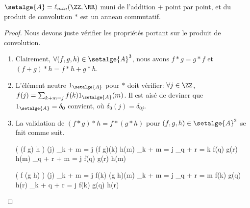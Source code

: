 
\begin{fact}
	$\setalge{A} = \ell_{min}(\ZZ , \RR)$
	muni de l'addition $+$ point par point, et du produit de convolution $\ast$
	est un anneau commutatif.
\end{fact}


\begin{proof}
	Nous devons juste vérifier les propriétés portant sur le produit de convolution.
	\begin{enumerate}
		\item Clairement,
		$\forall (f,g,h) \in \setalge{A}^3$, nous avons
		$f \ast g = g \ast f$
		et
		$(f + g) \ast h = f \ast h + g \ast h$.


		\item L'élément neutre $1_{\setalge{A}}$ pour $\ast$ doit vérifier:
		$\forall j \in \ZZ$,
		$f(j) = \sum_{k + m = j} f(k) 1_{\setalge{A}}(m)$.
		Il est aisé de deviner que $1_{\setalge{A}} = \delta_0$ convient,
		où $\delta_{0}(j) = \delta_{0j}$.


		\item La validation de
		$(f \ast g) \ast h = f \ast (g \ast h)$
		pour
		$(f,g,h) \in \setalge{A}^3$
		se fait comme suit.

		\begin{multicols}{2}
        	\setlength{\columnseprule}{.75pt}
	
	
    		\begin{stepcalc}[style=ar*]
    			\big( (f \ast g) \ast h \big) (j)
    		\explnext{}
    			\dsum_{k + m = j} (f \ast g)(k) h(m)
    		\explnext{}
    			\dsum_{k + m = j} \dsum_{q + r = k} f(q) g(r) h(m)
    		\explnext{}
    			\dsum_{q + r + m = j} f(q) g(r) h(m)
    		\end{stepcalc}
	
	
    		\begin{stepcalc}[style=ar*]
    			\big( f \ast (g \ast h) \big) (j)
    		\explnext{}
    			\dsum_{k + m = j} f(k) (g \ast h)(m)
    		\explnext{}
    			\dsum_{k + m = j} \dsum_{q + r = m} f(k) g(q) h(r)
    		\explnext{}
    			\dsum_{k + q + r = j} f(k) g(q) h(r)
    		\end{stepcalc}
    	\end{multicols}
	\end{enumerate}
	
	\null\vspace{-8ex}
\end{proof}




